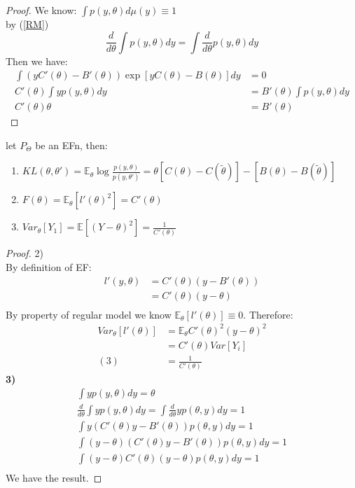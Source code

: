 \begin{proof}
	We know:
	$\int p(y, \theta) d\mu(y) \equiv 1$ \\
	by (\ref{RM})
	\begin{equation*}
			\frac{d}{d\theta} \int p(y, \theta) dy = \int \frac{d}{d\theta} p(y, \theta) dy
	\end{equation*}
	Then we have:
	\begin{align*}
		\int (y C'(\theta) - B'(\theta)) \exp [yC(\theta) - B(\theta)] dy &= 0 \\
		C'(\theta) \int y p(y, \theta)dy &= B'(\theta) \int p(y, \theta) dy\\
		C'(\theta) \theta &= B'(\theta)
	\end{align*}
\end{proof}

\begin{lemma} \label{theorem: Properties of EFn}
	let $P_\Theta$ be an EFn, then:
	\begin{enumerate}
		\item $KL(\theta, \theta') = \mathbb{E}_\theta \log \frac{p(y, \theta)}{p(y, \theta')} = \theta[C(\theta) - C(\tilde{\theta})] - [B(\theta) - B(\tilde{\theta})] $
		\item $F(\theta) = \mathbb{E}_\theta[ l'(\theta)^2] = C'(\theta)$
		\item $Var_\theta[Y_1] = \mathbb{E}[(Y - \theta)^2] = \frac{1}{C'(\theta)}$
	\end{enumerate}
\end{lemma}

\begin{proof}
	2)\\
	By definition of EF:
	\begin{align*}
		l'(y, \theta) &= C'(\theta)(y - B'(\theta))\\
					  &= C'(\theta)(y - \theta)\\
	\end{align*}
	By property of regular model we know $\mathbb{E}_\theta[l'(\theta)] \equiv 0$. Therefore:
	\begin{align*}
		Var_\theta[l'(\theta)] &= \mathbb{E}_\theta C'(\theta)^2 (y - \theta)^2\\
		&= C'(\theta)Var[Y_i] \\
		(3) &= \frac{1}{C'(\theta)}
	\end{align*}
\textbf{3)}
\begin{equation*}
	\begin{aligned}
		\int y p(y, \theta)dy = \theta \\
		\frac{d}{d\theta} \int y p(y, \theta) dy = \int \frac{d}{d\theta} y p(\theta, y) dy = 1\\
		\int y(C'(\theta)y - B'(\theta))p(\theta, y)dy = 1\\
		\int (y - \theta)(C'(\theta)y - B'(\theta))p(\theta, y)dy = 1\\
		\int (y - \theta) C'(\theta)(y - \theta)p(\theta, y)dy = 1\\
	\end{aligned}
\end{equation*}
We have the result.
\end{proof}

